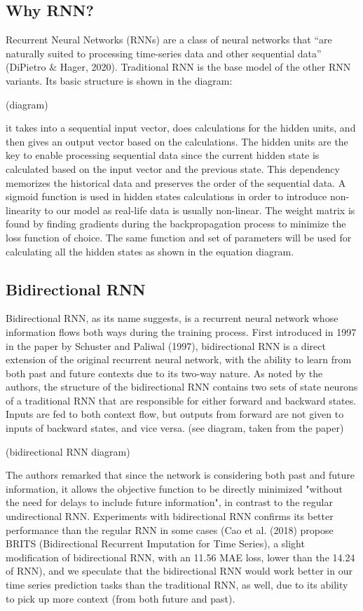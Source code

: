\documentclass[letterpaper, 10 pt, conference]{ieeeconf}  %
\begin{document}
    \subsection{Why RNN?}
        Recurrent Neural Networks (RNNs) are a class of neural networks that “are naturally suited to processing time-series data and other sequential data” (DiPietro \& Hager, 2020). Traditional RNN is the base model of the other RNN variants. Its basic structure is shown in the diagram:
        
        (diagram)
        
        it takes into a sequential input vector, does calculations for the hidden units, and then gives an output vector based on the calculations. The hidden units are the key to enable processing sequential data since the current hidden state is calculated based on the input vector and the previous state. This dependency memorizes the historical data and preserves the order of the sequential data. A sigmoid function is used in hidden states calculations in order to introduce non-linearity to our model as real-life data is usually non-linear. The weight matrix is found by finding gradients during the backpropagation process to minimize the loss function of choice. The same function and set of parameters will be used for calculating all the hidden states as shown in the equation diagram.

    \subsection{Bidirectional RNN}
        Bidirectional RNN, as its name suggests, is a recurrent neural network whose information flows both ways during the training process. First introduced in 1997 in the paper by Schuster and Paliwal (1997), bidirectional RNN is a direct extension of the original recurrent neural network, with the ability to learn from both past and future contexts due to its two-way nature. As noted by the authors, the structure of the bidirectional RNN contains two sets of state neurons of a traditional RNN that are responsible for either forward and backward states. Inputs are fed to both context flow, but outputs from forward are not given to inputs of backward states, and vice versa. (see diagram, taken from the paper)
        
        (bidirectional RNN diagram)

        The authors remarked that since the network is considering both past and future information, it allows the objective function to be directly minimized "without the need for delays to include future information", in contrast to the regular undirectional RNN. Experiments with bidirectional RNN confirms its better performance than the regular RNN in some cases (Cao et al. (2018) propose BRITS (Bidirectional Recurrent Imputation for Time Series), a slight modification of bidirectional RNN, with an 11.56 MAE loss, lower than the 14.24 of RNN), and we speculate that the bidirectional RNN would work better in our time series prediction tasks than the traditional RNN, as well, due to its ability to pick up more context (from both future and past).
\end{document}
